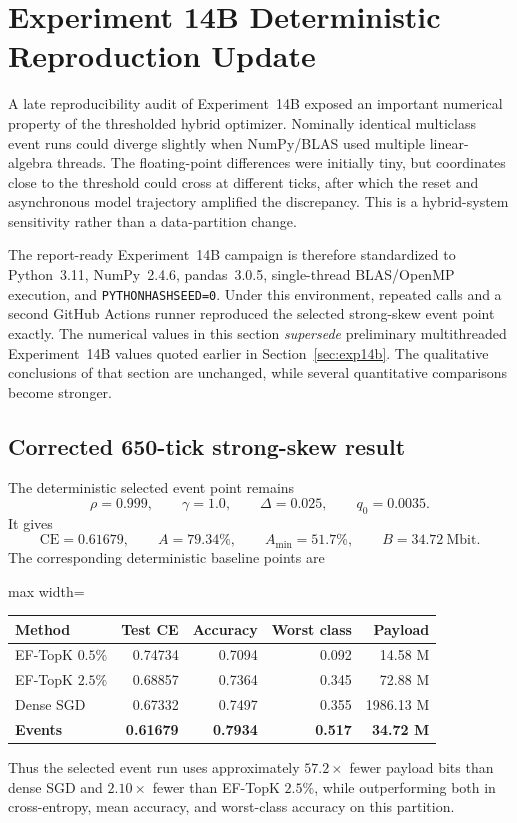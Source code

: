 \section{Experiment 14B Deterministic Reproduction Update}
\label{sec:exp14b-deterministic}

A late reproducibility audit of Experiment~14B exposed an important numerical property of the thresholded hybrid optimizer. Nominally identical multiclass event runs could diverge slightly when NumPy/BLAS used multiple linear-algebra threads. The floating-point differences were initially tiny, but coordinates close to the threshold could cross at different ticks, after which the reset and asynchronous model trajectory amplified the discrepancy. This is a hybrid-system sensitivity rather than a data-partition change.

The report-ready Experiment~14B campaign is therefore standardized to Python~3.11, NumPy~2.4.6, pandas~3.0.5, single-thread BLAS/OpenMP execution, and \texttt{PYTHONHASHSEED=0}. Under this environment, repeated calls and a second GitHub Actions runner reproduced the selected strong-skew event point exactly. The numerical values in this section \emph{supersede} preliminary multithreaded Experiment~14B values quoted earlier in Section~\ref{sec:exp14b}. The qualitative conclusions of that section are unchanged, while several quantitative comparisons become stronger.

\subsection{Corrected 650-tick strong-skew result}

The deterministic selected event point remains
\begin{equation}
\rho=0.999,\qquad \gamma=1.0,\qquad \Delta=0.025,\qquad q_0=0.0035.
\end{equation}
It gives
\begin{equation}
\boxed{
\mathrm{CE}=0.61679,\qquad
A=79.34\%,\qquad
A_{\min}=51.7\%,\qquad
B=34.72\ \mathrm{Mbit}.
}
\end{equation}
The corresponding deterministic baseline points are
\begin{center}
\begin{adjustbox}{max width=\textwidth}
\begin{tabular}{lrrrr}
\toprule
Method & Test CE & Accuracy & Worst class & Payload\\
\midrule
EF-TopK $0.5\%$ & 0.74734 & 0.7094 & 0.092 & 14.58 M\\
EF-TopK $2.5\%$ & 0.68857 & 0.7364 & 0.345 & 72.88 M\\
Dense SGD & 0.67332 & 0.7497 & 0.355 & 1986.13 M\\
\textbf{Events} & \textbf{0.61679} & \textbf{0.7934} & \textbf{0.517} & \textbf{34.72 M}\\
\bottomrule
\end{tabular}
\end{adjustbox}
\end{center}
Thus the selected event run uses approximately $57.2\times$ fewer payload bits than dense SGD and $2.10\times$ fewer than EF-TopK $2.5\%$, while outperforming both in cross-entropy, mean accuracy, and worst-class accuracy on this partition.

